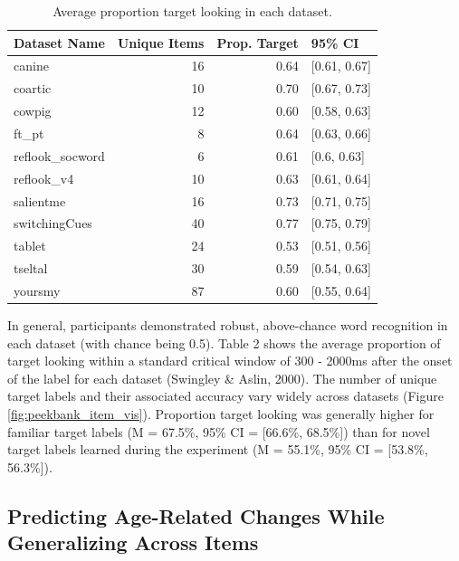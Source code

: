 \documentclass[10pt, letterpaper]{article}
\begin{document}
\begin{table}[H]
\centering
\begingroup\fontsize{9pt}{10pt}\selectfont
\begin{tabular}{lrrl}
  \hline
Dataset Name & Unique Items & Prop. Target & 95\% CI \\ 
  \hline
canine & 16 & 0.64 & [0.61, 0.67] \\ 
  coartic & 10 & 0.70 & [0.67, 0.73] \\ 
  cowpig & 12 & 0.60 & [0.58, 0.63] \\ 
  ft\_pt & 8 & 0.64 & [0.63, 0.66] \\ 
  reflook\_socword & 6 & 0.61 & [0.6, 0.63] \\ 
  reflook\_v4 & 10 & 0.63 & [0.61, 0.64] \\ 
  salientme & 16 & 0.73 & [0.71, 0.75] \\ 
  switchingCues & 40 & 0.77 & [0.75, 0.79] \\ 
  tablet & 24 & 0.53 & [0.51, 0.56] \\ 
  tseltal & 30 & 0.59 & [0.54, 0.63] \\ 
  yoursmy & 87 & 0.60 & [0.55, 0.64] \\ 
   \hline
\end{tabular}
\endgroup
\caption{Average proportion target looking in each dataset.} 
\end{table}

In general, participants demonstrated robust, above-chance word
recognition in each dataset (with chance being 0.5). Table 2 shows the
average proportion of target looking within a standard critical window
of 300 - 2000ms after the onset of the label for each dataset (Swingley
\& Aslin, 2000). The number of unique target labels and their associated
accuracy vary widely across datasets (Figure
\ref{fig:peekbank_item_vis}). Proportion target looking was generally
higher for familiar target labels (M = 67.5\%, 95\% CI = {[}66.6\%,
68.5\%{]}) than for novel target labels learned during the experiment (M
= 55.1\%, 95\% CI = {[}53.8\%, 56.3\%{]}).

\hypertarget{predicting-age-related-changes-while-generalizing-across-items}{%
\subsection{Predicting Age-Related Changes While Generalizing Across
Items}\label{predicting-age-related-changes-while-generalizing-across-items}}
\end{document}
